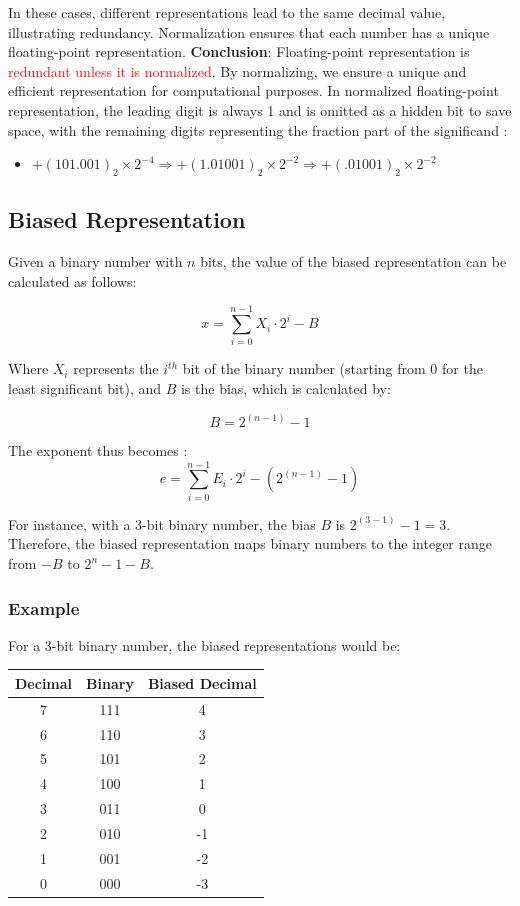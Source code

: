 \documentclass[12pt,openany, tikz,border=10pt]{book}
\begin{document}
    
    In these cases, different representations lead to the same decimal value, illustrating redundancy. Normalization ensures that each number has a unique floating-point representation. 
    \vskip 0.5cm
    \textbf{Conclusion}: Floating-point representation is \textcolor{red}{redundant unless it is normalized}. By normalizing, we ensure a unique and efficient representation for computational purposes.
\vskip 0.5cm
    In normalized floating-point representation, the leading digit is always 1 and is omitted as a hidden bit to save space, with the remaining digits representing the fraction part of the significand :
    \begin{itemize}
        \item[] \( +(101.001)_2 \times 2^{-4} \Rightarrow +(1.01001)_2 \times 2^{-2} \Rightarrow +(.01001)_2 \times 2^{-2} \)
    \end{itemize}




\newpage
\subsection{Biased Representation}

Given a binary number with $n$ bits, the value of the biased representation can be calculated as follows:

\[
x = \sum_{i=0}^{n-1} X_i \cdot 2^i - B
\]

Where $X_i$ represents the $i^{th}$ bit of the binary number (starting from 0 for the least significant bit), and $B$ is the bias, which is calculated by:

\[
B = 2^{(n-1)} - 1
\]


The exponent thus becomes : 
\[ e = \sum_{i=0}^{n-1} E_i \cdot 2^i - (2^{(n-1)} - 1) \]

For instance, with a 3-bit binary number, the bias $B$ is $2^{(3-1)} - 1 = 3$. Therefore, the biased representation maps binary numbers to the integer range from $-B$ to $2^n - 1 - B$.

\subsubsection{Example}

For a 3-bit binary number, the biased representations would be:

\begin{center}
\begin{tabular}{ccc}
\textbf{Decimal} & \textbf{Binary} & \textbf{Biased Decimal} \\
\hline
7 & 111 & 4 \\
6 & 110 & 3 \\
5 & 101 & 2 \\
4 & 100 & 1 \\
3 & 011 & 0 \\
2 & 010 & -1 \\
1 & 001 & -2 \\
0 & 000 & -3 \\
\end{tabular}
\end{center}
\end{document}
